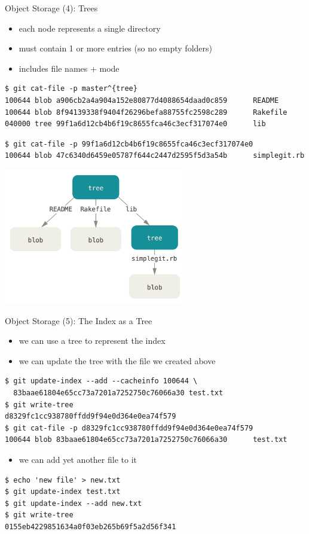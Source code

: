 \begin{frame}[fragile]{Object Storage (4): Trees}
  \begin{itemize}
    \item each node represents a single directory
    \item must contain 1 or more entries (so no empty folders)
    \item includes file names + mode
  \end{itemize}
\begin{lstlisting}[style=ShellCmd]
$ git cat-file -p master^{tree}
100644 blob a906cb2a4a904a152e80877d4088654daad0c859      README
100644 blob 8f94139338f9404f26296befa88755fc2598c289      Rakefile
040000 tree 99f1a6d12cb4b6f19c8655fca46c3ecf317074e0      lib
\end{lstlisting}
\begin{lstlisting}[style=ShellCmd]
$ git cat-file -p 99f1a6d12cb4b6f19c8655fca46c3ecf317074e0
100644 blob 47c6340d6459e05787f644c2447d2595f5d3a54b      simplegit.rb
\end{lstlisting}
\includegraphics[width=0.60\textwidth]{imgs/object_tree}
\end{frame}

\begin{frame}[fragile]{Object Storage (5): The Index as a Tree}
  \begin{itemize}
    \item we can use a tree to represent the index
    \item we can update the tree with the file we created above
  \end{itemize}
\begin{lstlisting}[style=ShellCmd]
$ git update-index --add --cacheinfo 100644 \
  83baae61804e65cc73a7201a7252750c76066a30 test.txt
$ git write-tree
d8329fc1cc938780ffdd9f94e0d364e0ea74f579
$ git cat-file -p d8329fc1cc938780ffdd9f94e0d364e0ea74f579
100644 blob 83baae61804e65cc73a7201a7252750c76066a30      test.txt
\end{lstlisting}

  \begin{itemize}
    \item we can add yet another file to it
  \end{itemize}

\begin{lstlisting}[style=ShellCmd]
$ echo 'new file' > new.txt
$ git update-index test.txt
$ git update-index --add new.txt
$ git write-tree
0155eb4229851634a0f03eb265b69f5a2d56f341
\end{lstlisting}
\end{frame}

